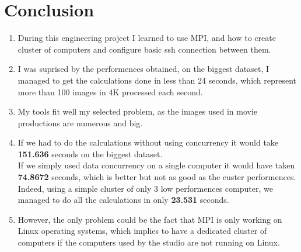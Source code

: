 \section{Conclusion}
\begin{enumerate}
    \item During this engineering project I learned to use MPI, and how to create cluster of computers and configure basic ssh connection between them.\\
    \item  I was suprised by the performences obtained, on the biggest dataset, I managed to get the calculations done in less than 24 seconds, which represent more than 100 images in 4K processed each second.\\
    \item  My tools fit well my selected problem, as the images used in movie productions are numerous and big.\\
    \item  If we had to do the calculations without using concurrency it would take \textbf{151.636} seconds on the biggest dataset.\\
    If we simply used data concurrency on a single computer it would have taken \textbf{74.8672} seconds, which is better but not as good as the custer performences.\\
    Indeed, using a simple cluster of only 3 low performences computer, we managed to do all the calculations in only \textbf{23.531} seconds.\\
    \item However, the only problem could be the fact that MPI is only working on Linux operating systems, which implies to have a dedicated cluster of computers if the computers used by the studio are not running on Linux.
\end{enumerate}